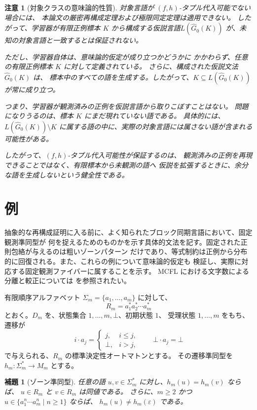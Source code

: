 \documentclass[11pt,a4paper]{ltjsarticle}
\newtheorem{lemma}[theorem]{補題}
\newtheorem{remark}[theorem]{注意}
\theoremstyle{remark}
\newcommand{\eps}{\varepsilon}
\begin{document}
\begin{remark}[対象クラスの意味論的性質]
対象言語が \((f,h)\)-タプル代入可能でない場合には、
本論文の厳密再構成定理および極限同定定理は適用できない。
したがって、学習器が有限正例標本 \(K\) から構成する仮説言語$  L(\widehat G_0(K))$
が、未知の対象言語と一致するとは保証されない。

ただし、学習器自体は、意味論的仮定が成り立つかどうかに
かかわらず、任意の有限正例標本 \(K\) に対して定義されている。
さらに、構成された仮説文法 \(\widehat G_0(K)\) は、
標本中のすべての語を生成する。したがって、$  K\subseteq L(\widehat G_0(K))$
が常に成り立つ。

つまり、学習器が観測済みの正例を仮説言語から取りこぼすことはない。
問題になりうるのは、標本 \(K\) にまだ現れていない語である。
具体的には、$  L(\widehat G_0(K))\setminus K$
に属する語の中に、実際の対象言語には属さない語が含まれる可能性がある。

したがって、\((f,h)\)-タプル代入可能性が保証するのは、
観測済みの正例を再現できることではなく、有限標本から未観測の語へ
仮説を拡張するときに、余分な語を生成しないという健全性である。
\end{remark}


\section{例}
\label{sec:running-examples}

抽象的な再構成証明に入る前に、よく知られたブロック同期言語において、固定観測準同型が
何を捉えるためのものかを示す具体的文法を記す。固定された正則包絡が与えるのは粗いゾーンパターン
だけであり、等式制約は正例から分布的に回復される。また、これらの例について意味論的仮定も
検証し、実際に対応する固定観測ファイバーに属することを示す。
MCFL における文字数による分離と較正については \cite{LehnerLindorfer2020} を参照されたい。

有限順序アルファベット \(\Sigma_m=\{a_1,\ldots,a_m\}\) に対して、
\[
  R_m=a_1^*a_2^*\cdots a_m^*
\]
とおく。\(D_m\) を、状態集合 \(1,\ldots,m,\bot\)、初期状態 \(1\)、
受理状態 \(1,\ldots,m\) をもち、遷移が
\[
  i\cdot a_j=
  \begin{cases}
    j, & i\le j,\\
    \bot, & i>j,
  \end{cases}
  \qquad
  \bot\cdot a_j=\bot
\]
で与えられる、\(R_m\) の標準決定性オートマトンとする。
その遷移準同型を \(h_m:\Sigma_m^*\to M_m\) とする。

\begin{lemma}[ゾーン準同型]
\label{lem:zone-morphism-basic}
任意の語 \(u,v\in\Sigma_m^*\) に対し、\(h_m(u)=h_m(v)\) ならば、
\(u\in R_m\) と \(v\in R_m\) は同値である。
さらに、\(m\ge2\) かつ
\(u\in\{a_1^n\cdots a_m^n\mid n\ge1\}\) ならば、
\(h_m(u)\ne h_m(\eps)\) である。
\end{lemma}
\end{document}
